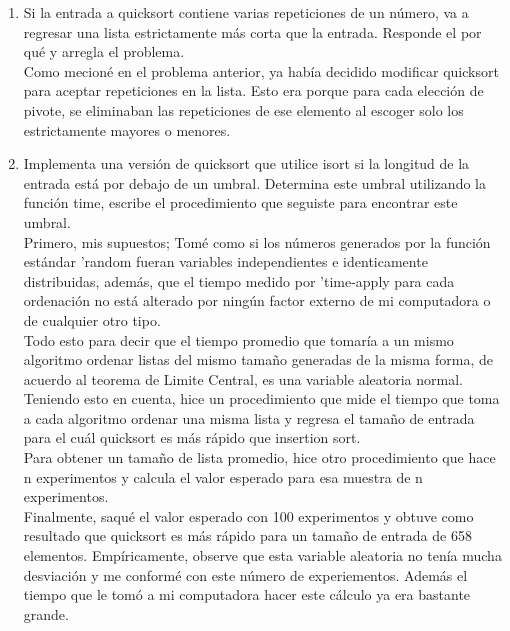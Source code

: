 \documentclass[12pt]{article}
\begin{document}
\begin{enumerate}
		\item{Si la entrada a quicksort contiene varias repeticiones de un número, va a regresar una lista estrictamente más corta que la entrada. 
				Responde el por qué y arregla el problema.}\\
				Como mecion\'e en el problema anterior, ya hab\'ia decidido modificar quicksort para aceptar repeticiones en la lista. Esto era porque
				para cada elecci\'on de pivote, se eliminaban las repeticiones de ese elemento al escoger solo los estrictamente mayores o menores.\\

\setcounter{enumi}{12}
		\item{Implementa una versión de quicksort que utilice isort si la longitud de la entrada está por debajo de un umbral. 
				Determina este umbral utilizando la función time, escribe el procedimiento que seguiste para encontrar este umbral.}\\

				Primero, mis supuestos; Tom\'e como si los n\'umeros generados por la funci\'on est\'andar 'random fueran variables independientes e identicamente
				distribuidas, adem\'as, que el tiempo medido por 'time-apply para cada ordenaci\'on no est\'a alterado por ning\'un factor externo de mi computadora
				o de cualquier otro tipo.\\ 
				Todo esto para decir que el tiempo promedio que tomar\'ia a un mismo algoritmo ordenar listas del mismo tama\~no generadas de la misma forma, 
				de acuerdo al teorema de Limite Central, es una variable aleatoria normal.\\

				Teniendo esto en cuenta, hice un procedimiento que mide el tiempo que toma a cada algoritmo ordenar una misma lista y regresa el tama\~no de entrada
				para el cu\'al quicksort es m\'as r\'apido que insertion sort.\\

				Para obtener un tama\~no de lista promedio, hice otro procedimiento que hace n experimentos y 
				calcula el valor esperado para esa muestra de n experimentos.\\

				Finalmente, saqu\'e el valor esperado con 100 experimentos y obtuve como resultado que quicksort es m\'as r\'apido para un tama\~no de entrada de 658
				elementos. Emp\'iricamente, observe que esta variable aleatoria no ten\'ia mucha desviaci\'on y me conform\'e con este n\'umero de experiementos.
				Adem\'as el tiempo que le tom\'o a mi computadora hacer este c\'alculo ya era bastante grande.\\

\end{enumerate}
\end{document}
